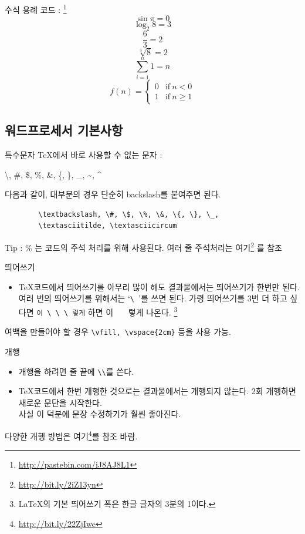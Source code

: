 \documentclass[12pt]{beamer}
\begin{document}
\begin{frame}{수식 용례}
	코드 : \footnote{\url{http://pastebin.com/iJ8AJ8L1}}
	\[ \sin{\pi} = 0 \]
	\[ \log_{2}{8} = 3 \]
	\[ \frac{6}{3} = 2 \]
	\[ \sqrt[3]{8} = 2 \]
	\[ \sum_{i=1}^{n}{1} = n \]
	\begin{equation}
		f(n) =
		\begin{cases}
			0 & \text{if}\ n < 0 \\ 
			1 & \text{if}\ n \geq 1
		\end{cases}
	\end{equation}
\end{frame}
\subsection{워드프로세서 기본사항}
\begin{frame}[fragile]{특수문자}
	\TeX 에서 바로 사용할 수 없는 문자 : 
	\begin{center}
		\textbackslash, \#, \$, \%, \&, \{, \}, \_, \textasciitilde, 
		\textasciicircum
	\end{center}
	다음과 같이, 대부분의 경우 단순히 backslash를 붙여주면 된다.
	\begin{verbatim}
		\textbackslash, \#, \$, \%, \&, \{, \}, \_,
		\textasciitilde, \textasciicircum
	\end{verbatim}
	Tip : \% 는 코드의 주석 처리를 위해 사용된다. 여러 줄 주석처리는 여기\footnote{\url{http://bit.ly/2iZ13yn}} 를 참조
\end{frame}
\begin{frame}[fragile]{띄어쓰기}
	\begin{itemize}
		\item \TeX 코드에서 띄어쓰기를 아무리 많이 해도 결과물에서는 
		띄어쓰기가 한번만 된다. \\
		여러 번의 띄어쓰기를 위해서는 `\verb|\ |'를 쓰면 된다.
		가령 띄어쓰기를 3번 더 하고 싶다면 \verb|이 \ \ \ 렇게| 하면
		이 \ \ \ 렇게 나온다.
		\footnote{\LaTeX 의 기본 띄어쓰기 폭은 한글 글자의 3분의 1이다.}
	\end{itemize}
	여백을 만들어야 할 경우 \verb|\vfill, \vspace{2cm}| 등을 사용 가능.
\end{frame}
\begin{frame}[fragile]{개행}
	\begin{itemize}
		\item 개행을 하려면 줄 끝에 \verb|\\|를 쓴다.
		\item \TeX 코드에서 한번 개행한 것으로는 결과물에서는 개행되지 
		않는다. 2회 개행하면 새로운 문단을 시작한다. \\
		사실 이 덕분에 문장 수정하기가 훨씬 좋아진다. 
	\end{itemize}
	다양한 개행 방법은 여기\footnote{\url{http://bit.ly/22ZjIwe}}를 참조 바람.
\end{frame}
\end{document}
